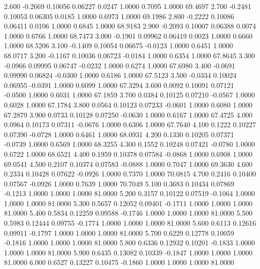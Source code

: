    2.600  -0.2669   0.10056   0.06227   0.0247   1.0000   0.7095   1.0000  69.4697
   2.700  -0.2481   0.10053   0.06305   0.0185   1.0000   0.6973   1.0000  69.1986
   2.800  -0.2222   0.10086   0.06411   0.0106   1.0000   0.6845   1.0000  68.9183
   2.900  -0.2093   0.10007   0.06388   0.0074   1.0000   0.6766   1.0000  68.7473
   3.000  -0.1901   0.09962   0.06419   0.0023   1.0000   0.6660   1.0000  68.5206
   3.100  -0.1409   0.10054   0.06675  -0.0123   1.0000   0.6451   1.0000  68.0717
   3.200  -0.1167   0.10036   0.06723  -0.0184   1.0000   0.6354   1.0000  67.8645
   3.300  -0.0966   0.09995   0.06747  -0.0232   1.0000   0.6274   1.0000  67.6980
   3.400  -0.0691   0.09990   0.06824  -0.0300   1.0000   0.6186   1.0000  67.5123
   3.500  -0.0334   0.10024   0.06955  -0.0391   1.0000   0.6099   1.0000  67.3294
   3.600   0.0092   0.10091   0.07121  -0.0500   1.0000   0.6031   1.0000  67.1859
   3.700   0.0384   0.10125   0.07210  -0.0567   1.0000   0.6028   1.0000  67.1784
   3.800   0.0564   0.10123   0.07233  -0.0601   1.0000   0.6080   1.0000  67.2879
   3.900   0.0733   0.10128   0.07250  -0.0630   1.0000   0.6167   1.0000  67.4725
   4.000   0.0964   0.10173   0.07311  -0.0676   1.0000   0.6306   1.0000  67.7640
   4.100   0.1222   0.10227   0.07390  -0.0728   1.0000   0.6461   1.0000  68.0931
   4.200   0.1330   0.10205   0.07371  -0.0739   1.0000   0.6569   1.0000  68.3255
   4.300   0.1552   0.10248   0.07421  -0.0780   1.0000   0.6722   1.0000  68.6521
   4.400   0.1959   0.10378   0.07584  -0.0868   1.0000   0.6908   1.0000  69.0541
   4.500   0.2107   0.10374   0.07583  -0.0888   1.0000   0.7047   1.0000  69.3630
   4.600   0.2334   0.10428   0.07622  -0.0926   1.0000   0.7370   1.0000  70.0815
   4.700   0.2416   0.10400   0.07567  -0.0926   1.0000   0.7639   1.0000  70.7049
   5.100   0.3683   0.10434   0.07869  -0.1213   1.0000   1.0000   1.0000  81.0000
   5.200   0.3157   0.10122   0.07519  -0.1064   1.0000   1.0000   1.0000  81.0000
   5.300   0.5657   0.12052   0.09401  -0.1711   1.0000   1.0000   1.0000  81.0000
   5.400   0.5834   0.12259   0.09588  -0.1746   1.0000   1.0000   1.0000  81.0000
   5.500   0.5983   0.12444   0.09755  -0.1774   1.0000   1.0000   1.0000  81.0000
   5.600   0.6113   0.12616   0.09911  -0.1797   1.0000   1.0000   1.0000  81.0000
   5.700   0.6229   0.12778   0.10059  -0.1816   1.0000   1.0000   1.0000  81.0000
   5.800   0.6336   0.12932   0.10201  -0.1833   1.0000   1.0000   1.0000  81.0000
   5.900   0.6435   0.13082   0.10339  -0.1847   1.0000   1.0000   1.0000  81.0000
   6.000   0.6527   0.13227   0.10475  -0.1860   1.0000   1.0000   1.0000  81.0000
